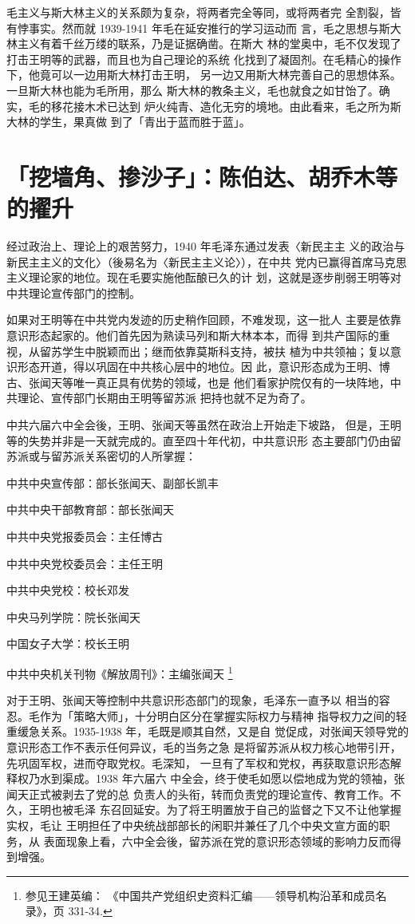 毛主义与斯大林主义的关系颇为复杂，将两者完全等同，或将两者完
全割裂，皆有悖事实。然而就 1939-1941 年毛在延安推行的学习运动而
言，毛之思想与斯大林主义有着千丝万缕的联系，乃是证据确凿。在斯大
林的堂奥中，毛不仅发现了打击王明等的武器，而且也为自己理论的系统
化找到了凝固剂。在毛精心的操作下，他竟可以一边用斯大林打击王明，
另一边又用斯大林完善自己的思想体系。一旦斯大林也能为毛所用，那么
斯大林的教条主义，毛也就食之如甘饴了。确实，毛的移花接木术已达到
炉火纯青、造化无穷的境地。由此看来，毛之所为斯大林的学生，果真做
到了「青出于蓝而胜于蓝」。

\section{「挖墙角、掺沙子」：陈伯达、胡乔木等的擢升}
经过政治上、理论上的艰苦努力，1940 年毛泽东通过发表〈新民主主
义的政治与新民主主义的文化〉（後易名为〈新民主主义论〉），在中共
党内已赢得首席马克思主义理论家的地位。现在毛要实施他酝酿已久的计
划，这就是逐步削弱王明等对中共理论宣传部门的控制。

如果对王明等在中共党内发迹的历史稍作回顾，不难发现，这一批人
主要是依靠意识形态起家的。他们首先因为熟读马列和斯大林本本，而得
到共产国际的重视，从留苏学生中脱颖而出；继而依靠莫斯科支持，被扶
植为中共领袖；复以意识形态开道，得以巩固在中共核心层中的地位。因
此，意识形态成为王明、博古、张闻天等唯一真正具有优势的领域，也是
他们看家护院仅有的一块阵地，中共理论、宣传部门长期由王明等留苏派
把持也就不足为奇了。

中共六届六中全会後，王明、张闻天等虽然在政治上开始走下坡路，
但是，王明等的失势并非是一天就完成的。直至四十年代初，中共意识形
态主要部门仍由留苏派或与留苏派关系密切的人所掌握：

中共中央宣传部：部长张闻天、副部长凯丰

中共中央干部教育部：部长张闻天

中共中央党报委员会：主任博古

中共中央党校委员会：主任王明

中共中央党校：校长邓发

中央马列学院：院长张闻天

中国女子大学：校长王明

中共中央机关刊物《解放周刊》：主编张闻天
\footnote{参见王建英编：
《中国共产党组织史资料汇编——领导机构沿革和成员名录》，页 331-34.}

对于王明、张闻天等控制中共意识形态部门的现象，毛泽东一直予以
相当的容忍。毛作为「策略大师」，十分明白区分在掌握实际权力与精神
指导权力之间的轻重缓急关系。1935-1938 年，毛既是顺其自然，又是自
觉促成，对张闻天领导党的意识形态工作不表示任何异议，毛的当务之急
是将留苏派从权力核心地带引开，先巩固军权，进而夺取党权。毛深知，
一旦有了军权和党权，再获取意识形态解释权乃水到渠成。1938 年六届六
中全会，终于使毛如愿以偿地成为党的领袖，张闻天正式被剥去了党的总
负责人的头衔，转而负责党的理论宣传、教育工作。不久，王明也被毛泽
东召回延安。为了将王明置放于自己的监督之下又不让他掌握实权，毛让
王明担任了中央统战部部长的闲职并兼任了几个中央文宣方面的职务，从
表面现象上看，六中全会後，留苏派在党的意识形态领域的影响力反而得
到增强。

